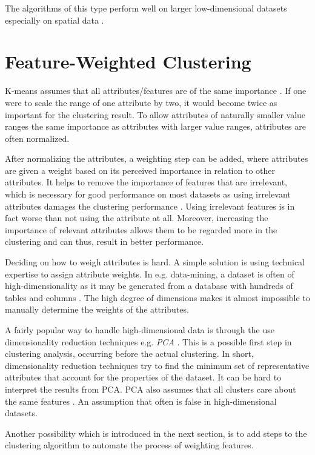 \documentclass[../report.tex]{subfiles}
\begin{document}
The algorithms of this type perform well on larger low-dimensional datasets especially on spatial data \cite{Ester1996}.

\section{Feature-Weighted Clustering}
\label{ch:weighed}

K-means assumes that all attributes/features are of the same importance \cite{Kaufman1990}. If one were to scale the range of one attribute by two, it would become twice as important for the clustering result. To allow attributes of naturally smaller value ranges the same importance as attributes with larger value ranges, attributes are often normalized.

After normalizing the attributes, a weighting step can be added, where attributes are given a weight based on its perceived importance in relation to other attributes. It helps to remove the importance of features that are irrelevant, which is necessary for good performance on most datasets as using irrelevant attributes damages the clustering performance \cite{Kaufman1990}. Using irrelevant features is in fact worse than not using the attribute at all. Moreover, increasing the importance of relevant attributes allows them to be regarded more in the clustering and can thus, result in better performance.

Deciding on how to weigh attributes is hard. A simple solution is using technical expertise to assign attribute weights. In e.g. data-mining, a dataset is often of high-dimensionality as it may be generated from a database with hundreds of tables and columns \cite{Jing2007}. The high degree of dimensions makes it almost impossible to manually determine the weights of the attributes.

A fairly popular way to handle high-dimensional data is through the use dimensionality reduction techniques e.g. \textit{PCA} \cite{Jolliffe2005,van2009}. This is a possible first step in clustering analysis, occurring before the actual clustering. In short, dimensionality reduction techniques try to find the minimum set of representative attributes that account for the properties of the dataset. It can be hard to interpret the results from PCA. PCA also assumes that all clusters care about the same features \cite{Deng2010}. An assumption that often is false in high-dimensional datasets.

Another possibility which is introduced in the next section, is to add steps to the clustering algorithm to automate the process of weighting features.
\end{document}
